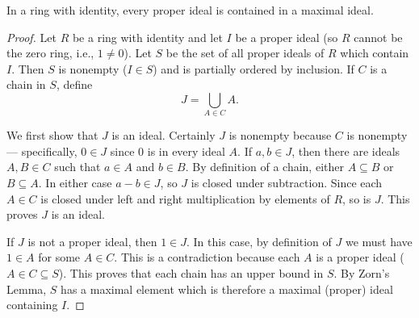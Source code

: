 \documentclass[11pt,a4paper]{article}
\begin{document}
\begin{prop}
    In a ring with identity, every proper ideal is contained in a maximal ideal.
\end{prop}
\begin{proof}
Let \( R \) be a ring with identity and let \( I \) be a proper ideal (so \( R \) cannot be the zero ring, i.e., \( 1 \neq 0 \)). Let \( S \) be the set of all proper ideals of \( R \) which contain \( I \). Then \( S \) is nonempty (\( I \in S \)) and is partially ordered by inclusion. If \( C \) is a chain in \( S \), define
\[
J = \bigcup_{A \in C} A.
\]

We first show that \( J \) is an ideal. Certainly \( J \) is nonempty because \( C \) is nonempty — specifically, \( 0 \in J \) since \( 0 \) is in every ideal \( A \). If \( a, b \in J \), then there are ideals \( A, B \in C \) such that \( a \in A \) and \( b \in B \). By definition of a chain, either \( A \subseteq B \) or \( B \subseteq A \). In either case \( a - b \in J \), so \( J \) is closed under subtraction. Since each \( A \in C \) is closed under left and right multiplication by elements of \( R \), so is \( J \). This proves \( J \) is an ideal.

If \( J \) is not a proper ideal, then \( 1 \in J \). In this case, by definition of \( J \) we must have \( 1 \in A \) for some \( A \in C \). This is a contradiction because each \( A \) is a proper ideal (\( A \in C \subseteq S \)). This proves that each chain has an upper bound in \( S \). By Zorn's Lemma, \( S \) has a maximal element which is therefore a maximal (proper) ideal containing \( I \).
\end{proof}


\end{document}
